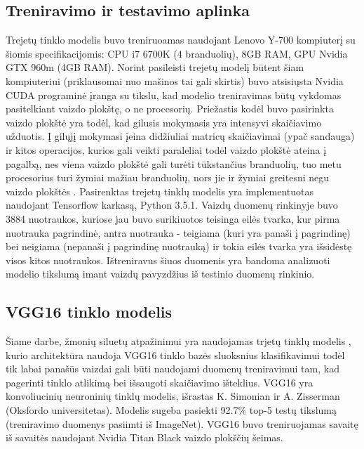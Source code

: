 \documentclass{VUMIFPSkursinis}
\DeclareRobustCommand{\[}{\begin{equation}}
\DeclareRobustCommand{\]}{\end{equation}}
\begin{document}
\subsection{Treniravimo ir testavimo aplinka}
Trejetų tinklo modelis buvo treniruoamas naudojant Lenovo Y-700 kompiuterį su šiomis specifikacijomis: CPU i7 6700K (4 branduolių), 8GB RAM, GPU Nvidia GTX 960m (4GB RAM). Norint pasileisti trejetų modelį būtent šiam kompiuteriui (priklausomai nuo mašinos tai gali skirtis) buvo atsisiųsta Nvidia CUDA programinė įranga su tikslu, kad modelio treniravimas būtų vykdomas pasitelkiant vaizdo plokštę, o ne procesorių.
\newline
Priežastis kodėl buvo pasirinkta vaizdo plokštė yra todėl, kad gilusis mokymasis yra intensyvi skaičiavimo užduotis. Į gilųjį mokymasi įeina didžiuliai matricų skaičiavimai (ypač sandauga) ir kitos operacijos, kurios gali veikti paraleliai todėl vaizdo plokštė ateina į pagalbą, nes viena vaizdo plokštė gali turėti tūkstančius branduolių, tuo metu procesorius turi žymiai mažiau branduolių, nors jie ir žymiai greitesni negu vaizdo plokštės \cite{Performance_of_GPU}.
\newline
Pasirenktas trejetų tinklų modelis yra implementuotas naudojant Tensorflow karkasą, Python 3.5.1.
\newline
Vaizdų duomenų rinkinyje buvo 3884 nuotraukos, kuriose jau buvo surikiuotos teisinga eilės tvarka, kur pirma nuotrauka pagrindinė, antra nuotrauka - teigiama (kuri yra panaši į pagrindinę) bei neigiama (nepanaši į pagrindinę nuotrauką) ir tokia eilės tvarka yra išsidėstę visos kitos nuotraukos.
Ištreniravus šiuos duomenis yra bandoma analizuoti modelio tikslumą imant vaizdų pavyzdžius iš testinio duomenų rinkinio.

\subsection{VGG16 tinklo modelis}
Šiame darbe, žmonių siluetų atpažinimui yra naudojamas trjetų tinklų modelis \cite{Aerial_image_similarity}, kurio architektūra naudoja VGG16 tinklo bazės sluoksnius klasifikavimui todėl tik labai panašūs vaizdai gali būti naudojami duomenų treniravimui tam, kad pagerinti tinklo atlikimą bei išsaugoti skaičiavimo išteklius.
\newline
VGG16 yra konvoliucinių neuroninių tinklų modelis, išrastas K. Simonian ir A. Zisserman (Oksfordo universitetas). Modelis sugeba pasiekti 92.7\% top-5 testų tikslumą (treniravimo duomenys pasiimti iš ImageNet). VGG16 buvo treniruojamas savaitę iš savaitės naudojant Nvidia Titan Black vaizdo plokščių šeimas.
\end{document}
